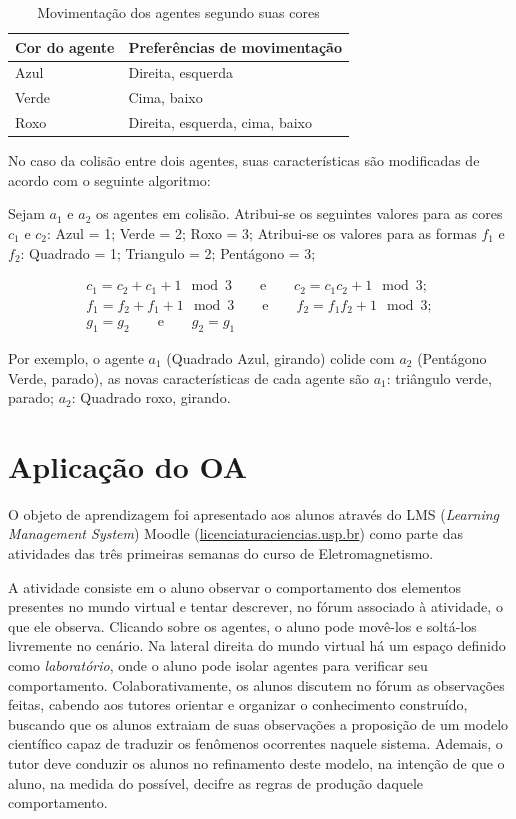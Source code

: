 \documentclass[a0,portrait]{a0poster}
\begin{document}
\footnotesize

\begin{table}
\begin{center}
	\begin{tabular}{ll}		
		Cor do agente & Preferências de movimentação \\
		\hline \hline
		Azul          & Direita, esquerda \\
		Verde         & Cima, baixo \\
		Roxo          & Direita, esquerda, cima, baixo
	\end{tabular}
	\caption{Movimentação dos agentes segundo suas cores}
	\label{tab:cor-vs-movimentacao}
\end{center}
\end{table}

\normalsize
No caso da colisão entre dois agentes, suas características são modificadas de
acordo com o seguinte algoritmo:

Sejam $a_1$ e $a_2$ os agentes em colisão. Atribui-se os seguintes valores para as cores $c_1$ e $c_2$: Azul = 1; Verde = 2; Roxo = 3;
Atribui-se os valores para as formas $f_1$ e $f_2$: Quadrado = 1; Triangulo = 2; Pentágono = 3;

\begin{gather}
c_1 = c_2 + c_1 + 1 \mod 3 \qquad\text{e}\qquad c_2 = c_1 c_2 + 1 \mod 3;\\
f_1 = f_2 + f_1 + 1 \mod 3 \qquad\text{e}\qquad f_2 = f_1 f_2 + 1 \mod 3;\\
g_1 = g_2 \qquad\text{e}\qquad g_2 = g_1
\end{gather}

Por exemplo, o agente $a_1$ (Quadrado Azul, girando) colide com $a_2$ (Pentágono Verde, parado),
as novas características de cada agente são $a_1$: triângulo verde, parado;
$a_2$: Quadrado roxo, girando. %

\section{Aplicação do OA}

O objeto de aprendizagem foi apresentado aos alunos através do LMS (\emph{Learning
Management System}) Moodle (\url{licenciaturaciencias.usp.br}) como parte das atividades das três primeiras semanas do curso de Eletromagnetismo. 

A atividade consiste em o aluno observar o comportamento dos elementos presentes no mundo virtual e tentar descrever, no fórum associado à atividade, 
o que ele observa. Clicando sobre os agentes, o aluno pode movê-los e soltá-los livremente no cenário. Na lateral direita do mundo virtual há um espaço 
definido como \emph{laboratório}, onde o aluno pode isolar agentes para verificar seu comportamento. Colaborativamente, os alunos discutem no fórum
as observações feitas, cabendo aos tutores orientar e organizar o conhecimento construído, buscando que os alunos extraiam de suas observações 
a proposição de um modelo científico capaz de traduzir os fenômenos ocorrentes naquele sistema. Ademais, o tutor deve conduzir os alunos no 
refinamento deste modelo, na intenção de que o aluno, na medida do possível, decifre as regras de produção daquele comportamento. 
\end{document}
